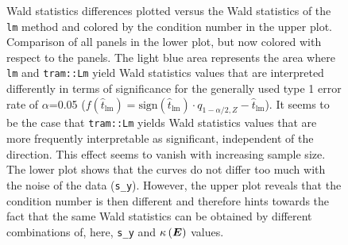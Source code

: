 \documentclass[11pt,a4paper,twoside]{book}\usepackage[]{graphicx}\usepackage[]{xcolor}
\begin{document}
\begin{figure}[H]
\caption{Wald statistics differences plotted versus the Wald statistics of the \texttt{lm} method and colored by the condition number in the upper plot. Comparison of all panels in the lower plot, but now colored with respect to the panels. The light blue area represents the area where \texttt{lm} and \texttt{tram::Lm} yield Wald statistics values that are interpreted differently in terms of significance for the generally used type 1 error rate of $\alpha$=0.05 ($f(\hat{t}_\text{lm})=\text{sign}(\hat{t}_\text{lm})\cdot q_{1-\alpha/2,Z} -\hat{t}_\text{lm}$). It seems to be the case that \texttt{tram::Lm} yields Wald statistics values that are more frequently interpretable as significant, independent of the direction. This effect seems to vanish with increasing sample size. The lower plot shows that the curves do not differ too much with the noise of the data (\texttt{s\_y}). However, the upper plot reveals that the condition number is then different and therefore hints towards the fact that the same Wald statistics can be obtained by different combinations of, here, \texttt{s\_y} and $\kappa\left({\boldsymbol{E}}\right)$ values. }
\label{fig:simres_differencevslm1}
\end{figure}

\vspace*{-1cm}
\end{document}
